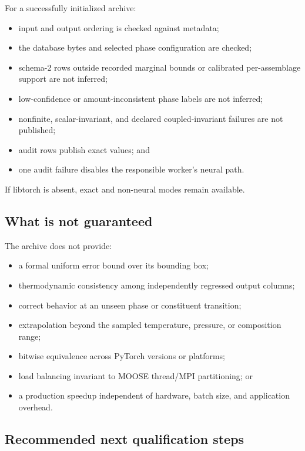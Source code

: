 \documentclass[11pt]{article}
\begin{document}
For a successfully initialized archive:
\begin{itemize}[leftmargin=*]
  \item input and output ordering is checked against metadata;
  \item the database bytes and selected phase configuration are checked;
  \item schema-2 rows outside recorded marginal bounds or calibrated per-assemblage support are
  not inferred;
  \item low-confidence or amount-inconsistent phase labels are not inferred;
  \item nonfinite, scalar-invariant, and declared coupled-invariant failures are not published;
  \item audit rows publish exact values; and
  \item one audit failure disables the responsible worker's neural path.
\end{itemize}
If libtorch is absent, exact and non-neural modes remain available.

\subsection{What is not guaranteed}

The archive does not provide:
\begin{itemize}[leftmargin=*]
  \item a formal uniform error bound over its bounding box;
  \item thermodynamic consistency among independently regressed output columns;
  \item correct behavior at an unseen phase or constituent transition;
  \item extrapolation beyond the sampled temperature, pressure, or composition range;
  \item bitwise equivalence across PyTorch versions or platforms;
  \item load balancing invariant to MOOSE thread/MPI partitioning; or
  \item a production speedup independent of hardware, batch size, and application overhead.
\end{itemize}

\subsection{Recommended next qualification steps}
\end{document}
